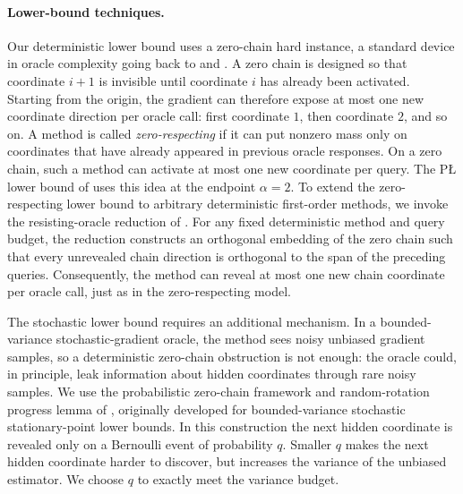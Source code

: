 \documentclass[11pt]{article}
\begin{document}
\paragraph{Lower-bound techniques.}
Our deterministic lower bound uses a zero-chain hard instance, a standard device in oracle complexity going back to
\citet{NemirovskyYudin1983} and \citet{Nesterov2004}. 
A zero chain is designed so that coordinate \(i+1\) is invisible
until coordinate \(i\) has already been activated. Starting from the origin, the gradient can therefore expose at most
one new coordinate direction per oracle call: first coordinate \(1\), then coordinate \(2\), and so on.
A method is called \emph{zero-respecting} if it can put nonzero mass only on coordinates
that have already appeared in previous oracle responses. On a zero chain, such a method can activate at most one new
coordinate per query. The P\L{} lower bound of \citet{YueFangLin2023} uses this idea at the endpoint \(\alpha=2\).
To extend the zero-respecting lower bound to arbitrary deterministic first-order methods, we invoke the
resisting-oracle reduction of \citet[Proposition~1]{CarmonDuchiHinderSidford2021}. For any fixed deterministic method
and query budget, the reduction constructs an orthogonal embedding of the zero chain such that every unrevealed chain
direction is orthogonal to the span of the preceding queries. Consequently, the method can reveal at most one new chain
coordinate per oracle call, just as in the zero-respecting model.

The stochastic lower bound requires an additional mechanism. In a bounded-variance stochastic-gradient oracle, the
method sees noisy unbiased gradient samples, so a deterministic zero-chain obstruction is not enough: the oracle could,
in principle, leak information about hidden coordinates through rare noisy samples. We use the probabilistic zero-chain
framework and random-rotation progress lemma of \citet{ArjevaniEtAl2019}, originally developed for bounded-variance
stochastic stationary-point lower bounds. In this construction the next hidden coordinate is revealed only on a
Bernoulli event of probability \(q\). Smaller \(q\) makes the next hidden coordinate harder to discover, but
increases the variance of the unbiased estimator. We choose \(q\) to exactly meet the variance budget.
\end{document}
